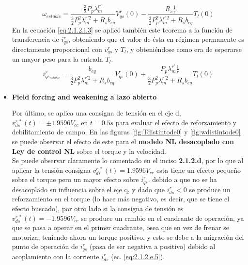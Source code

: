 \documentclass[10pt]{article}
\begin{document}
\begin{itemize}
	\begin{equation}
	\omega_{estable}=\frac{\frac{3}{2}P_{p}\lambda^{r'}_{m}}{\frac{3}{2}P^{2}_{p}\lambda^{r'2}_{m}+ R_{s}b_{eq}}V^{r}_{qs}(0) -  \frac{R_{s} \frac{1}{r}}{\frac{3}{2}P^{2}_{p}\lambda^{r'2}_{m}+ R_{s}b_{eq}}T_{l}(0)
	\label{eq:2.1.2.i.2}
	\end{equation}
	En la ecuación \ref{eq:2.1.2.i.3} se aplicó también este teorema a la función de transferencia de $i^{r}_{qs}$, obteniendo que el valor de ésta en régimen permanente es directamente proporcional con $v^{r}_{qs}$ y $T_{l}$, y obteniéndose como era de esperarse un mayor peso para la entrada $T_{l}$.
	\begin{equation}
	i^{r}_{qs_{estable}}=\frac{b_{eq}}{\frac{3}{2}P^{2}_{p}\lambda^{r'2}_{m}+ R_{s}b_{eq}}V^{r}_{qs}(0) +  \frac{P_{p}\lambda^{r'}_{m} \frac{1}{r}}{\frac{3}{2}P^{2}_{p}\lambda^{r'2}_{m}+ R_{s}b_{eq}}T_{l}(0)
	\label{eq:2.1.2.i.3}
	\end{equation}
	
	\item \textbf{Field forcing and weakening a lazo abierto}
	
	Por último, se aplica una consigna de tensión en el eje d, $v^{r \ *}_{ds}(t)=\pm 1.9596 V_{cc}$ en $t=0.5 s$ para evaluar el efecto de reforzamiento y debilitamiento de campo. En las figuras \ref{fig:Tdistintode0} y \ref{fig:wdistintode0} se puede observar el efecto de este para el \textbf{modelo NL desacoplado con Ley de control NL} sobre el torque y la velocidad.\\
	Se puede observar claramente lo comentado en el inciso \textbf{2.1.2.d}, por lo que al aplicar la tensión consigna $v^{r \ *}_{ds}(t)= 1.9596 V_{cc}$ esta tiene un efecto pequeño sobre el torque pero un mayor efecto sobre $i^{r}_{qs}$. debido a que no se ha desacoplado su influencia sobre el eje q, y dado que $i^{r}_{ds}<0$ se produce un reforzamiento en el torque (lo hace más negativo, es decir, que se tiene el efecto buscado), por otro lado si la consigna de tensión es  $v^{r \ *}_{ds}(t)= -1.9596 V_{cc}$ se produce un cambio en el cuadrante de operación, ya que se pasa a operar en el primer cuadrante, osea que en vez de frenar se motoriza, teniendo ahora un torque positivo, y esto se debe a la migración del punto de operación de $i^{r}_{qs}$ (pasa de ser negativa a positivo) debido al acoplamiento con la corriente $i^{r}_{ds}$ (ec. \ref{eq:2.1.2.e.5}).
	

\end{itemize}
\end{document}
